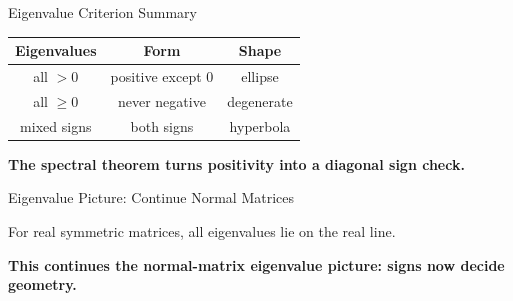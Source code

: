 \documentclass[10pt]{beamer}
\theoremstyle{definition}
\newcommand{\x}[1]{\alert{\textbf{#1}}}
\begin{document}
\begin{frame}{Eigenvalue Criterion Summary}

\begin{center}
\renewcommand{\arraystretch}{1.25}
\begin{tabular}{c|c|c}
\textbf{Eigenvalues} & \textbf{Form} & \textbf{Shape}\\
\hline
all $>0$ & positive except $0$ & ellipse\\
all $\ge0$ & never negative & degenerate\\
mixed signs & both signs & hyperbola
\end{tabular}
\end{center}

\vfill

\begin{center}
\x{The spectral theorem turns positivity into a diagonal sign check.}
\end{center}

\end{frame}


\begin{frame}{Eigenvalue Picture: Continue Normal Matrices}

For real symmetric matrices, all eigenvalues lie on the real line.

\vfill

\begin{center}
\end{center}

\vfill

\begin{center}
\x{This continues the normal-matrix eigenvalue picture: signs now decide geometry.}
\end{center}

\end{frame}
\end{document}

